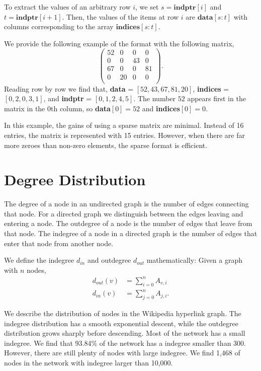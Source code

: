 \documentclass{article}
\begin{document}
To extract the values of an arbitrary row $i$, we set $s = \textbf{indptr}[i]$ and $t = \textbf{indptr}[i+1]$. Then, the values of the items at row $i$ are $\textbf{data}[s:t]$ with columns corresponding to the array $\textbf{indices}[s:t]$. 

We provide the following example of the format with the following matrix,
\begin{equation*}
    \begin{pmatrix}
        52 & 0  & 0  & 0  \\
        0  & 0  & 43 & 0  \\
        67 & 0  & 0  & 81  \\
        0  & 20 & 0  & 0  \\
    \end{pmatrix}.
\end{equation*}
Reading row by row we find that, \textbf{data} = $[52, 43, 67, 81, 20]$, \textbf{indices} = $[0, 2, 0, 3, 1]$, and \textbf{indptr} = $[0, 1, 2, 4, 5]$. The number $52$ appears first in the matrix in the 0th column, so \textbf{data}$[0] = 52$ and \textbf{indices}$[0] = 0$.

In this example, the gains of using a sparse matrix are minimal. Instead of 16 entries, the matrix is represented with 15 entries. However, when there are far more zeroes than non-zero elements, the sparse format is efficient.


\section{Degree Distribution}

The degree of a node in an undirected graph is the number of edges connecting that node. For a directed graph we distinguish between the edges leaving and entering a node. 
The outdegree of a node is the number of edges that leave from that node.
The indegree of a node in a directed graph is the number of edges that enter that node from another node.

We define the indegree $d_{in}$ and outdegree $d_{out}$ mathematically:
Given a graph with $n$ nodes,
\begin{align*}
    d_{out} (v) & = \sum^n_{i=0} A_{v, i} \\
    d_{in} (v) & = \sum^n_{j=0} A_{j, i}. 
\end{align*}

We describe the distribution of nodes in the Wikipedia hyperlink graph.
The indegree distribution has a smooth exponential descent, while the outdegree distribution grows sharply before descending. 
Most of the network has a small indegree. We find that 93.84\% of the network has a indegree smaller than 300. However, there are still plenty of nodes with large indegree. We find 1,468 of nodes in the network with indegree larger than 10,000.
\end{document}
